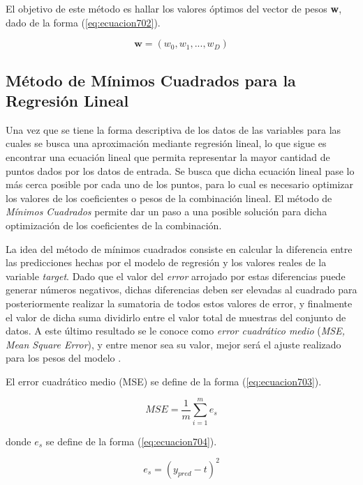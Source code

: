 El objetivo de este método es hallar los valores óptimos del vector de pesos \textbf{w}, dado de la forma (\ref{eq:ecuacion702}).

\begin{equation}
	\textbf{w}=(w_0,w_1,...,w_D)
	\label{eq:ecuacion702}
\end{equation}

\subsection{Método de Mínimos Cuadrados para la Regresión Lineal}

Una vez que se tiene la forma descriptiva de los datos de las variables para las cuales se busca una aproximación mediante regresión lineal, lo que sigue es encontrar una ecuación lineal que permita representar la mayor 
cantidad de puntos dados por los datos de entrada. Se busca que dicha ecuación lineal pase lo más cerca posible por cada uno de los puntos, para lo cual es necesario optimizar los valores de los coeficientes o pesos de la 
combinación lineal. El método de \textit{Mínimos Cuadrados} permite dar un paso a una posible solución para dicha optimización de los coeficientes de la combinación.

La idea del método de mínimos cuadrados consiste en calcular la diferencia entre las predicciones hechas por el modelo de regresión y los valores reales de la variable \textit{target}. Dado que el valor del \textit{error} 
arrojado por estas diferencias puede generar números negativos, dichas diferencias deben ser elevadas al cuadrado para posteriormente realizar la sumatoria de todos estos valores de error, y finalmente el valor de dicha 
suma dividirlo entre el valor total de muestras del conjunto de datos. A este último resultado se le conoce como \textit{error cuadrático medio} (\textit{MSE, Mean Square Error}), y entre menor sea su valor, mejor será el 
ajuste realizado para los pesos del modelo \cite{PinedaPertuzML}.

El error cuadrático medio (MSE) se define de la forma (\ref{eq:ecuacion703}).

\begin{equation}
	MSE=\frac{1}{m} \sum_{i=1}^{m}e_s
	\label{eq:ecuacion703}
\end{equation}

donde $e_s$ se define de la forma (\ref{eq:ecuacion704}).

\begin{equation}
	e_s=(y_{pred} - t)^2
	\label{eq:ecuacion704}
\end{equation}

